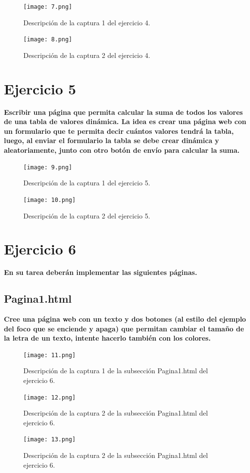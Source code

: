 \documentclass{article}
\begin{document}
\begin{figure}[htbp]
    \centering
    \texttt{[image: 7.png]}
    \caption{Descripción de la captura 1 del ejercicio 4.}
\end{figure}
\begin{figure}[htbp]
    \centering
    \texttt{[image: 8.png]}
    \caption{Descripción de la captura 2 del ejercicio 4.}
\end{figure}

\section{Ejercicio 5}
\textbf{Escribir una página que permita calcular la suma de todos los valores de una tabla de valores dinámica. La idea es crear una página web con un formulario que te permita decir cuántos valores tendrá la tabla, luego, al enviar el formulario la tabla se debe crear dinámica y aleatoriamente, junto con otro botón de envío para calcular la suma.}

\begin{figure}[htbp]
    \centering
    \texttt{[image: 9.png]}
    \caption{Descripción de la captura 1 del ejercicio 5.}
\end{figure}
\begin{figure}[htbp]
    \centering
    \texttt{[image: 10.png]}
    \caption{Descripción de la captura 2 del ejercicio 5.}
\end{figure}

\section{Ejercicio 6}
\textbf{En su tarea deberán implementar las siguientes páginas.}
\subsection{Pagina1.html}
\textbf{Cree una página web con un texto y dos botones (al estilo del ejemplo del foco que se enciende y apaga) que permitan cambiar el tamaño de la letra de un texto, intente hacerlo también con los colores.}

\begin{figure}[htbp]
    \centering
    \texttt{[image: 11.png]}
    \caption{Descripción de la captura 1 de la subsección Pagina1.html del ejercicio 6.}
\end{figure}
\begin{figure}[htbp]
    \centering
    \texttt{[image: 12.png]}
    \caption{Descripción de la captura 2 de la subsección Pagina1.html del ejercicio 6.}
\end{figure}
\begin{figure}[htbp]
    \centering
    \texttt{[image: 13.png]}
    \caption{Descripción de la captura 2 de la subsección Pagina1.html del ejercicio 6.}
\end{figure}
\end{document}
